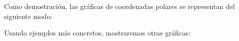 Como demostración, las gráficas de coordenadas polares se representan del siguiente modo:


Usando ejemplos más concretos, mostraremos otras gráficas:

